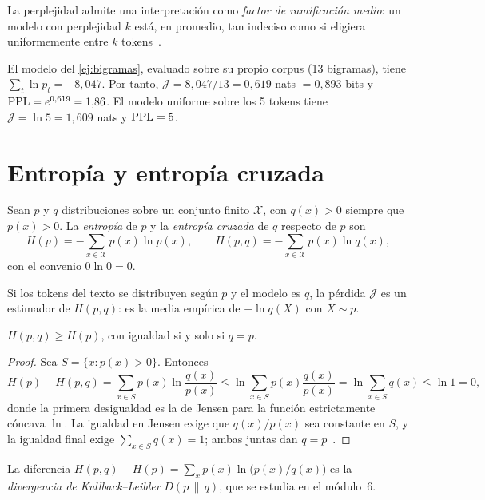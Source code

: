 La perplejidad admite una interpretación como \emph{factor de ramificación medio}: un modelo con perplejidad $k$ está, en promedio, tan indeciso como si eligiera uniformemente entre $k$ tokens~\cite[§3.3.1]{jm3}.

\begin{ejemplo}\label{ej:ppl}
El modelo del \cref{ej:bigramas}, evaluado sobre su propio corpus (13 bigramas), tiene $\sum_t\ln p_t=-8{,}047$. Por tanto, $\mathcal{J}=8{,}047/13=0{,}619$ nats $=0{,}893$ bits y $\operatorname{PPL}=e^{0{,}619}=1{,}86$. El modelo uniforme sobre los 5 tokens tiene $\mathcal{J}=\ln 5=1{,}609$ nats y $\operatorname{PPL}=5$.
\end{ejemplo}

\section{Entropía y entropía cruzada}

\begin{definicion}
Sean $p$ y $q$ distribuciones sobre un conjunto finito $\mathcal{X}$, con $q(x)>0$ siempre que $p(x)>0$. La \emph{entropía} de $p$ y la \emph{entropía cruzada} de $q$ respecto de $p$ son
\[
H(p)=-\sum_{x\in\mathcal{X}}p(x)\ln p(x),\qquad
H(p,q)=-\sum_{x\in\mathcal{X}}p(x)\ln q(x),
\]
con el convenio $0\ln 0=0$.
\end{definicion}

Si los tokens del texto se distribuyen según $p$ y el modelo es $q$, la pérdida $\mathcal{J}$ es un estimador de $H(p,q)$: es la media empírica de $-\ln q(X)$ con $X\sim p$.

\begin{teorema}\label{teo:gibbs}
$H(p,q)\ge H(p)$, con igualdad si y solo si $q=p$.
\end{teorema}

\begin{proof}
Sea $S=\{x:p(x)>0\}$. Entonces
\[
H(p)-H(p,q)=\sum_{x\in S}p(x)\ln\frac{q(x)}{p(x)}\le\ln\sum_{x\in S}p(x)\frac{q(x)}{p(x)}=\ln\sum_{x\in S}q(x)\le\ln 1=0,
\]
donde la primera desigualdad es la de Jensen para la función estrictamente cóncava $\ln$. La igualdad en Jensen exige que $q(x)/p(x)$ sea constante en $S$, y la igualdad final exige $\sum_{x\in S}q(x)=1$; ambas juntas dan $q=p$~\cite[teorema~2.6.3]{ct}.
\end{proof}

La diferencia $H(p,q)-H(p)=\sum_x p(x)\ln\bigl(p(x)/q(x)\bigr)$ es la \emph{divergencia de Kullback–Leibler} $D(p\,\|\,q)$, que se estudia en el módulo~6.

